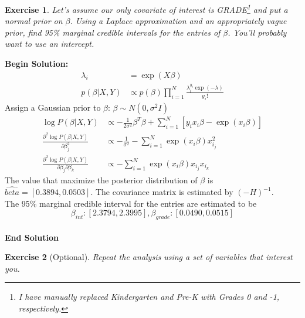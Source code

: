 \documentclass[twoside]{article}
\newcounter{lecnum}
\newtheorem{exercise}{Exercise}[lecnum]
\begin{document}
  \begin{exercise}
    Let's assume our only covariate of interest is GRADE\footnote{I have manually replaced Kindergarten and Pre-K with Grades 0 and -1, respectively.} and put a normal prior on $\beta$. Using a Laplace approximation and an appropriately vague prior, find  95\% marginal credible intervals for the entries of $\beta$. You'll probably want to use an intercept.
  \end{exercise}
\textbf{Begin Solution:}
\begin{equation*}
\begin{split}
\lambda_i &= \exp(X\beta)\\
p(\beta|X,Y)&\propto p(\beta) {\displaystyle \prod_{i=1}^{N} \frac{\lambda_i^{y_i}\exp(-\lambda)}{y_i!}}
\end{split}
\end{equation*}
Assign a Gaussian prior to $\beta$: $\beta \sim N(0,\sigma^2I)$\\
\begin{equation*}
\begin{split}
\log P(\beta|X,Y) &\propto -\frac{1}{2\sigma^2}\beta^T\beta+\sum_{i=1}^N\left[y_ix_i\beta-\exp(x_i\beta) \right]\\
\frac{\partial^2 \log P(\beta|X,Y)}{\partial \beta_j^2} &\propto -\frac{1}{\sigma^2}-\sum_{i=1}^N \exp(x_i\beta)x_{i_j}^2\\
\frac{\partial^2 \log P(\beta|X,Y)}{\partial \beta_j \partial \beta_k} & \propto -\sum_{i=1}^N \exp (x_i\beta) x_{i_j} x_{i_k}
\end{split}
\end{equation*}
The value that maximize the posterior distribution of $\beta$ is $\hat{beta} = [0.3894, 0.0503]$. The covariance matrix is estimated by $(-H)^{-1}$.\\
The 95\% marginal credible interval for the entries are estimated to be\\
$$\beta_{int}:[2.3794,2.3995],\beta_{grade}:[0.0490,0.0515]$$\\
\textbf{End Solution}

  \begin{exercise}[Optional]
    Repeat the analysis using a set of variables that interest you.
  \end{exercise}
\end{document}
